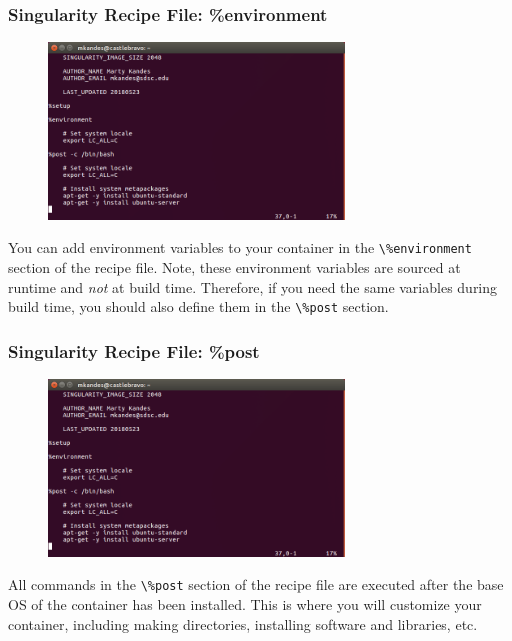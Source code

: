 \documentclass{beamer}
\begin{document}
\begin{frame}
   \frametitle{Singularity Recipe File: \%environment}
   \begin{figure}[htbp]
      \includegraphics[width=0.7\textwidth]{images/singularity-definition-file-env.png}
   \end{figure}
   You can add environment variables to your container in the
   \lstinline{\%environment} section of the recipe file. Note, these
   environment variables are sourced at runtime and \textit{not} at
   build time. Therefore, if you need the same variables during build
   time, you should also define them in the \lstinline{\%post} section.
\end{frame}

\begin{frame}
   \frametitle{Singularity Recipe File: \%post}
   \begin{figure}[htbp]
      \includegraphics[width=0.7\textwidth]{images/singularity-definition-file-env.png}
   \end{figure}
   All commands in the \lstinline{\%post} section of the recipe file are
   executed after the base OS of the container has been installed. This
   is where you will customize your container, including making
   directories, installing software and libraries, etc.
\end{frame}
\end{document}
